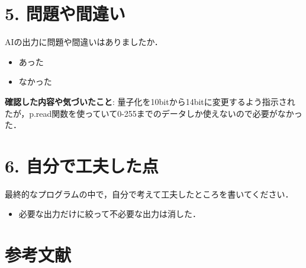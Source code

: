 \documentclass[a4paper,11pt]{jsarticle}
\begin{document}
\section*{5. 問題や間違い}
AIの出力に問題や間違いはありましたか．
\begin{itemize}
    \item[$\boxtimes$] あった
    \item[$\square$] なかった
\end{itemize}
\textbf{確認した内容や気づいたこと}:
量子化を10bitから14bitに変更するよう指示されたが，p.read関数を使っていて0-255までのデータしか使えないので必要がなかった．

\section*{6. 自分で工夫した点}
最終的なプログラムの中で，自分で考えて工夫したところを書いてください．
\begin{itemize}
    \item 必要な出力だけに絞って不必要な出力は消した．
\end{itemize}

\section*{参考文献}
\end{document}
